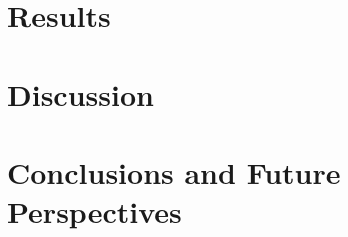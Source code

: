 \documentclass[11pt,twoside,a4paper]{report}
\begin{document}
\chapter{Results}



\clearpage

\chapter{Discussion}


\clearpage

\chapter{Conclusions and Future Perspectives}



\cleardoublepage
%
%


\end{document}
